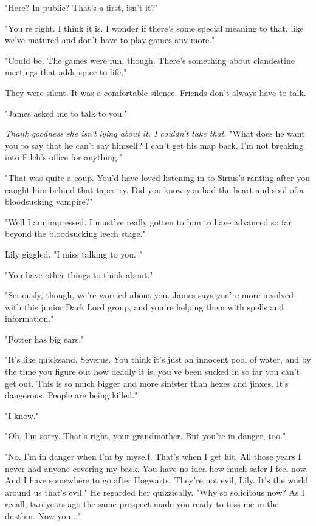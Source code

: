 \documentclass[a4paper,11pt]{article}
\begin{document}
"Here? In public? That's a first, isn't it?"

"You're right. I think it is. I wonder if there's some special meaning to that, like we've matured and don't have to play games any more."

"Could be. The games were fun, though. There's something about clandestine meetings that adds spice to life."

They were silent. It was a comfortable silence. Friends don't always have to talk.

"James asked me to talk to you."

\emph{Thank goodness she isn't lying about it. I couldn't take that.} "What does he want you to say that he can't say himself? I can't get his map back. I'm not breaking into Filch's office for anything."

"That was quite a coup. You'd have loved listening in to Sirius's ranting after you caught him behind that tapestry. Did you know you had the heart and soul of a bloodsucking vampire?"

"Well I am impressed. I must've really gotten to him to have advanced so far beyond the bloodsucking leech stage."

Lily giggled. "I miss talking to you. "

"You have other things to think about."

"Seriously, though, we're worried about you. James says you're more involved with this junior Dark Lord group, and you're helping them with spells and information."

"Potter has big ears."

"It's like quicksand, Severus. You think it's just an innocent pool of water, and by the time you figure out how deadly it is, you've been sucked in so far you can't get out. This is so much bigger and more sinister than hexes and jinxes. It's dangerous. People are being killed."

"I know."

"Oh, I'm sorry. That's right, your grandmother. But you're in danger, too."

"No. I'm in danger when I'm by myself. That's when I get hit. All those years I never had anyone covering my back. You have no idea how much safer I feel now. And I have somewhere to go after Hogwarts. They're not evil, Lily. It's the world around us that's evil." He regarded her quizzically. "Why so solicitous now? As I recall, two years ago the same prospect made you ready to toss me in the dustbin. Now you..."
\end{document}
